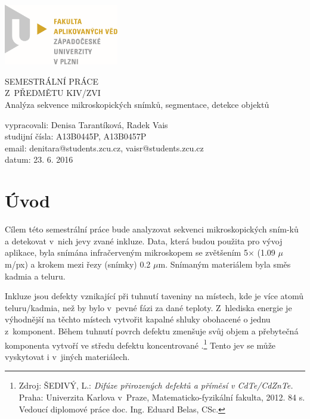 \documentclass[12pt, a4paper]{report}
\begin{document}
	\begin{titlepage}
	\includegraphics[width=5cm,natwidth=601,natheight=314]{obrazky/logo.png}
		
	\vspace{4cm}
		\begin {center}
		{\Huge SEMESTRÁLNÍ PRÁCE\\ Z~PŘEDMĚTU KIV/ZVI\\}
		\vspace{1cm}
		{\huge Analýza sekvence mikroskopických snímků, segmentace, detekce objektů\\}
		\end {center}
	\vspace{6cm}
			
	\noindent vypracovali: Denisa Tarantíková, Radek Vais \\
				studijní čísla: A13B0445P, A13B0457P\\
				email:	denitara@students.zcu.cz, vaisr@students.zcu.cz\\
				datum:	23. 6. 2016
	\end{titlepage}

\tableofcontents

\chapter{Úvod}
	Cílem této semestrální práce bude analyzovat sekvenci mikroskopických sním-ků a detekovat v~nich jevy zvané inkluze. Data, která budou použita pro vývoj aplikace, byla snímána infračerveným mikroskopem se zvětšením 5$\times$ (1.09 $\mu$m/px) a krokem mezi řezy (snímky) 0.2 $\mu$m. Snímaným materiálem byla směs kadmia a teluru. 
	
	Inkluze jsou defekty vznikající při tuhnutí taveniny na místech, kde je více atomů teluru/kadmia, než by bylo v~pevné fázi za dané teploty. Z~hlediska energie je výhodnější na těchto místech vytvořit kapalné shluky obohacené o jednu z~komponent. Během tuhnutí povrch defektu zmenšuje svůj objem a přebytečná komponenta vytvoří ve středu defektu koncentrované .\footnote{	Zdroj: ŠEDIVÝ, L.: \emph{Difúze přirozených defektů a příměsí v CdTe/CdZnTe.} Praha: Univerzita Karlova v~Praze, Matematicko-fyzikální fakulta, 2012. 84 s. Vedoucí diplomové práce doc. Ing. Eduard Belas, CSc.} Tento jev se může vyskytovat i v~jiných materiálech. 
\end{document}
